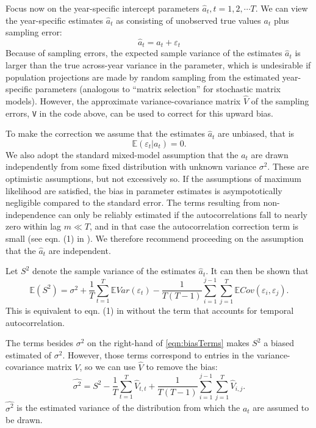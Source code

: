 \documentclass[12pt]{article}
\newcommand{\be}{\begin{equation}}
\newcommand{\ee}{\end{equation}}
\begin{document}
\begin{spacing}{1.35}
	Focus now on the year-specific intercept parameters $\hat{a}_t, t = 1,2,\cdots T$. 
	We can view the year-specific estimates $\hat{a}_t$ as consisting of unobserved true values $a_t$ plus sampling error:
	\be
	\hat{a}_t= a_t + \varepsilon_t 
	\ee
	Because of sampling errors, the expected sample variance of the estimates $\hat{a}_t$ is larger 
	than the true across-year variance in the parameter, which is undesirable if population projections are made
	by random sampling from the estimated year-specific parameters (analogous to ``matrix selection'' for stochastic
	matrix models). However, the approximate variance-covariance matrix $\hat{V}$ of the sampling errors, \texttt{V} in the code 
	above, can be used to correct for this upward bias.   
	
	To make the correction we assume that the estimates $\hat{a}_t$ are unbiased, that is
	\be
	\mathbb{E}(\varepsilon_t \vert a_t) = 0.    
	\ee
	We also adopt the standard mixed-model assumption that the $a_t$ are drawn 
	independently from some fixed distribution with unknown variance $\sigma^2$. 
	These are optimistic assumptions, but not excessively so. If the assumptions of maximum likelihood are satisfied, 
	the bias in parameter estimates is asympototically negligible compared to the standard error. 
	The terms resulting from non-independence can only be reliably estimated if 
	the autocorrelations fall to nearly zero within lag $m \ll T$, 
	and in that case the autocorrelation correction term is small (see eqn. (1) in \citet{gould-nichols-1998}). 
	We therefore recommend proceeding on the assumption that the $\hat{a}_t$ are independent. 
	
	Let $S^2$ denote the sample variance of the estimates $\hat{a}_t$. It can then be shown that 
	\be
	\mathbb{E}(S^2) = \sigma^2  + \frac{1}{T}\sum\limits_{t=1}^T \mathbb{E} Var(\varepsilon_t) 
	- \frac{1}{T(T-1)}\sum\limits_{i=1}^{j-1} \sum\limits_{j=1}^T \mathbb{E}Cov(\varepsilon_i, \varepsilon_j). 
	\label{eqn:biasTerms}
	\ee
	This is equivalent to eqn. (1) in \citet{gould-nichols-1998} without the term that 
	accounts for temporal autocorrelation. 
	
	The terms besides $\sigma^2$ on the right-hand of \eqref{eqn:biasTerms} makes $S^2$ a biased estimated of $\sigma^2$. 
	However, those terms correspond to entries in the variance-covariance matrix $V$, so we can use $\hat{V}$ to remove 
	the bias: 
	\be
	\hat{\sigma^2}  = S^2 - \frac{1}{T}\sum\limits_{t=1}^T \hat{V}_{t,t} + 
	\frac{1}{T(T-1)}\sum\limits_{i=1}^{j-1} \sum\limits_{j=1}^T \hat{V}_{i,j}. 
	\label{eqn:hatSigma}
	\ee
	$\hat{\sigma^2}$ is the estimated variance of the distribution from which the $a_t$ are assumed
	to be drawn. 
	

\end{spacing}
\end{document}
